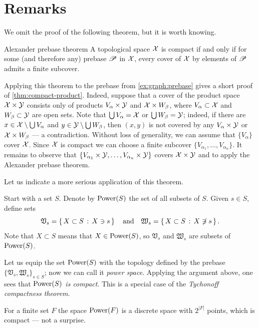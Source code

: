 \section{Remarks}

We omit the proof of the following theorem, but it is worth knowing.

\begin{thm}{Alexander prebase theorem}
A topological space $\mathcal{X}$ is compact if and only if for some (and therefore any) prebase $\mathscr{P}$ in $\mathcal{X}$, every cover of $\mathcal{X}$ by elements of $\mathscr{P}$ admits a finite subcover.
\end{thm}

Applying this theorem to the prebase from \ref{ex:graph:prebase} gives a short proof of \ref{thm:compact-product}.
Indeed, suppose that a cover of the product space $\mathcal{X}\times \mathcal{Y}$ consists only of products $V_\alpha\times \mathcal{Y}$ and $\mathcal{X}\times W_\beta$, where $V_\alpha\subset \mathcal{X}$ and $W_\beta\z\subset \c{Y}$ are open sets.
Note that $\bigcup V_\alpha= \mathcal{X}$ or $\bigcup W_\beta= \mathcal{Y}$;
indeed, if there are $x\in \mathcal{X}\setminus \bigcup V_\alpha$ and $y\in \mathcal{Y}\setminus\bigcup W_\beta$, then $(x,y)$ is not covered by any $V_\alpha\times \mathcal{Y}$ or $\mathcal{X}\times W_\beta$ --- a contradiction.
Without loss of generality, we can assume that $\{V_\alpha\}$ cover $\mathcal{X}$.
Since $\mathcal{X}$ is compact we can choose a finite subcover $\{V_{\alpha_1},\ldots,V_{\alpha_n}\}$.
It remains to observe that $\{V_{\alpha_1}\times \mathcal{Y},\ldots,V_{\alpha_n}\times \mathcal{Y}\}$ covers $\mathcal{X}\times\mathcal{Y}$ and to apply the Alexander prebase theorem.

Let us indicate a more serious application of this theorem.

Start with a set $S$.
Denote by $\mathrm{Power}(S)$ the set of all subsets of $S$.
Given $s\in S$, define sets
\[\mathfrak{V}_s=\left\{\,{X\subset S}\,:\,{X\ni s}\,\right\}
\quad\text{and}\quad
\mathfrak{W}_s=\left\{\,{X\subset S}\,:\,{X\not\ni s}\,\right\}.
\]
Note that $X\subset S$ means that $X\in \mathrm{Power}(S)$, so $\mathfrak{V}_s$ and $\mathfrak{W}_s$ are subsets of $\mathrm{Power}(S)$.

Let us equip the set $\mathrm{Power}(S)$ with the topology defined by the prebase $\{\mathfrak{V}_s,\mathfrak{W}_s\}_{s\in S}$; now we can call it \emph{power space}.
Applying the argument above, one sees that \textit{$\mathrm{Power}(S)$ is compact}.
This is a special case of the \emph{Tychonoff compactness theorem}.

For a finite set $F$ the space $\mathrm{Power}(F)$ is a discrete space with $2^{|F|}$ points, which is compact --- not a surprise.


